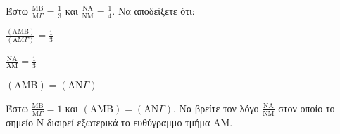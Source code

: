 \begin{alist}
    \item Έστω $\frac{\text{MB}}{\text{M}\Gamma} = \frac{1}{3}$ και $\frac{\text{NA}}{\text{NM}} = \frac{1}{4}$. Να αποδείξετε ότι:
    \begin{rlist}
        \item $\frac{\left(\text{AMB}\right)}{\left(\text{AM}\Gamma\right)} = \frac{1}{3}$ 
        \item $\frac{\text{NA}}{\text{AM}} = \frac{1}{3}$ 
        \item $\left(\text{AMB}\right) = \left(\text{AN}\Gamma\right)$ 
    \end{rlist}
    \item Έστω $\frac{\text{MB}}{\text{M}\Gamma} = 1$ και $\left(\text{AMB}\right) = \left(\text{AN}\Gamma\right)$. Να βρείτε τον λόγο $\frac{\text{NA}}{\text{NM}}$ στον οποίο το σημείο Ν διαιρεί εξωτερικά το ευθύγραμμο τμήμα ΑΜ. 
\end{alist}